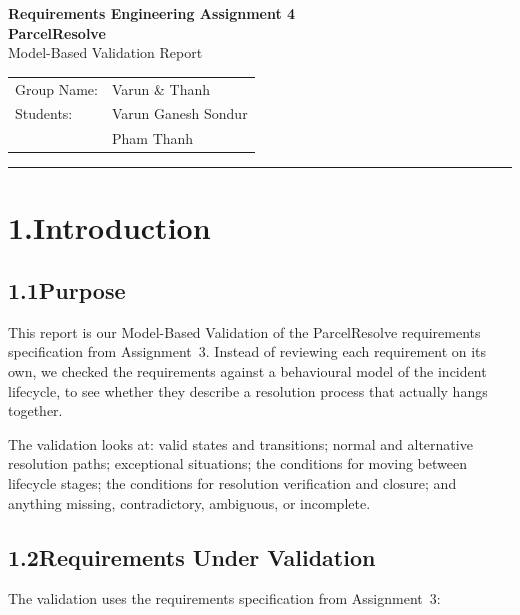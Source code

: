 \documentclass[11pt,a4paper]{article}
\begin{document}
\begin{center}
{\large\bfseries Requirements Engineering Assignment 4}\\[0.2cm]
{\Large\bfseries ParcelResolve}\\[0.15cm]
{\large Model-Based Validation Report}\\[0.4cm]
\begin{tabular}{ll}
Group Name: & Varun \& Thanh \\
Students:   & Varun Ganesh Sondur \\
            & Pham Thanh \\
\end{tabular}
\end{center}
\vspace{4pt}\hrule\vspace{8pt}

\section*{1.\enspace Introduction}

\subsection*{1.1\enspace Purpose}

This report is our Model-Based Validation of the ParcelResolve requirements specification from Assignment~3. Instead of reviewing each requirement on its own, we checked the requirements against a behavioural model of the incident lifecycle, to see whether they describe a resolution process that actually hangs together.

The validation looks at: valid states and transitions; normal and alternative resolution paths; exceptional situations; the conditions for moving between lifecycle stages; the conditions for resolution verification and closure; and anything missing, contradictory, ambiguous, or incomplete.

\subsection*{1.2\enspace Requirements Under Validation}

The validation uses the requirements specification from Assignment~3:
\end{document}
